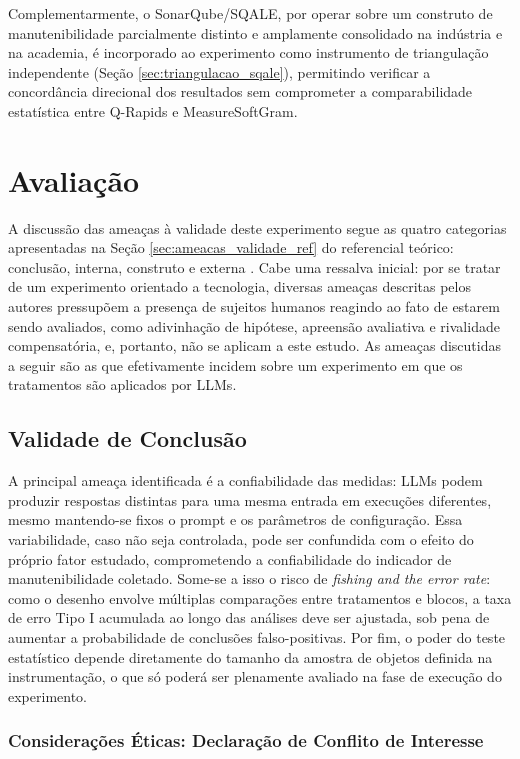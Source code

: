 Complementarmente, o SonarQube/SQALE, por operar sobre um construto de manutenibilidade parcialmente distinto e amplamente consolidado na indústria e na academia, é incorporado ao experimento como instrumento de triangulação independente (Seção \ref{sec:triangulacao_sqale}), permitindo verificar a concordância direcional dos resultados sem comprometer a comparabilidade estatística entre Q-Rapids e MeasureSoftGram.

\section{Avaliação}
\label{sec:avaliacao}

A discussão das ameaças à validade deste experimento segue as quatro categorias apresentadas na Seção \ref{sec:ameacas_validade_ref} do referencial teórico: conclusão, interna, construto e externa . Cabe uma ressalva inicial: por se tratar de um experimento orientado a tecnologia, diversas ameaças descritas pelos autores pressupõem a presença de sujeitos humanos reagindo ao fato de estarem sendo avaliados, como adivinhação de hipótese, apreensão avaliativa e rivalidade compensatória, e, portanto, não se aplicam a este estudo. As ameaças discutidas a seguir são as que efetivamente incidem sobre um experimento em que os tratamentos são aplicados por LLMs.

\subsection{Validade de Conclusão}

A principal ameaça identificada é a confiabilidade das medidas: LLMs podem produzir respostas distintas para uma mesma entrada em execuções diferentes, mesmo mantendo-se fixos o prompt e os parâmetros de configuração. Essa variabilidade, caso não seja controlada, pode ser confundida com o efeito do próprio fator estudado, comprometendo a confiabilidade do indicador de manutenibilidade coletado. Some-se a isso o risco de \textit{fishing and the error rate}: como o desenho envolve múltiplas comparações entre tratamentos e blocos, a taxa de erro Tipo I acumulada ao longo das análises deve ser ajustada, sob pena de aumentar a probabilidade de conclusões falso-positivas. Por fim, o poder do teste estatístico depende diretamente do tamanho da amostra de objetos definida na instrumentação, o que só poderá ser plenamente avaliado na fase de execução do experimento.

\subsubsection{Considerações Éticas: Declaração de Conflito de Interesse}
\label{sec:conflito_interesse}

